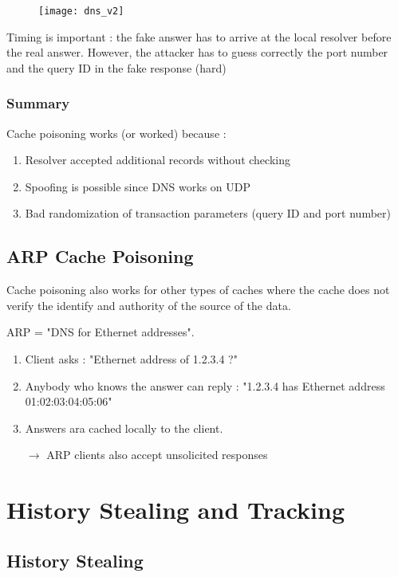 \begin{figure}[H]
    \centering
    \texttt{[image: dns\_v2]}
\end{figure}

Timing is important : the fake answer has to arrive at the local resolver before the real answer. However, the attacker has to guess correctly the port number and the query ID in the fake response (hard)

\subsection{Summary}

Cache poisoning works (or worked) because :
\begin{enumerate}
    \item Resolver accepted additional records without checking
    \item Spoofing is possible since DNS works on UDP
    \item Bad randomization of transaction parameters (query ID and port number)
\end{enumerate}

\section{ARP Cache Poisoning}

Cache poisoning also works for other types of caches where the cache does not verify the identify and authority of the source of the data.

ARP = "DNS for Ethernet addresses".
\begin{enumerate}
    \item Client asks : "Ethernet address of 1.2.3.4 ?"
    \item Anybody who knows the answer can reply : "1.2.3.4 has Ethernet address 01:02:03:04:05:06"
    \item Answers ara cached locally to the client.
    \item[$\rightarrow$] ARP clients also accept unsolicited responses
\end{enumerate}

\chapter{History Stealing and Tracking}

\section{History Stealing}

